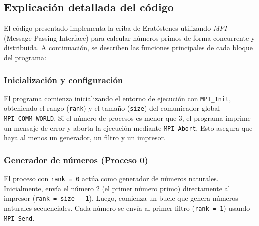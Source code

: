 \documentclass[a4paper,12pt]{article}
\begin{document}




\subsection{Explicación detallada del código}

El código presentado implementa la criba de Eratóstenes utilizando \textit{MPI} (Message Passing Interface) para calcular números primos de forma concurrente y distribuida. A continuación, se describen las funciones principales de cada bloque del programa:

\subsubsection{Inicialización y configuración}
El programa comienza inicializando el entorno de ejecución con \texttt{MPI\_Init}, obteniendo el rango (\texttt{rank}) y el tamaño (\texttt{size}) del comunicador global \texttt{MPI\_COMM\_WORLD}. Si el número de procesos es menor que 3, el programa imprime un mensaje de error y aborta la ejecución mediante \texttt{MPI\_Abort}. Esto asegura que haya al menos un generador, un filtro y un impresor.

\subsubsection{Generador de números (Proceso 0)}
El proceso con \texttt{rank = 0} actúa como generador de números naturales. Inicialmente, envía el número 2 (el primer número primo) directamente al impresor (\texttt{rank = size - 1}). Luego, comienza un bucle que genera números naturales secuenciales. Cada número se envía al primer filtro (\texttt{rank = 1}) usando \texttt{MPI\_Send}.
\end{document}
